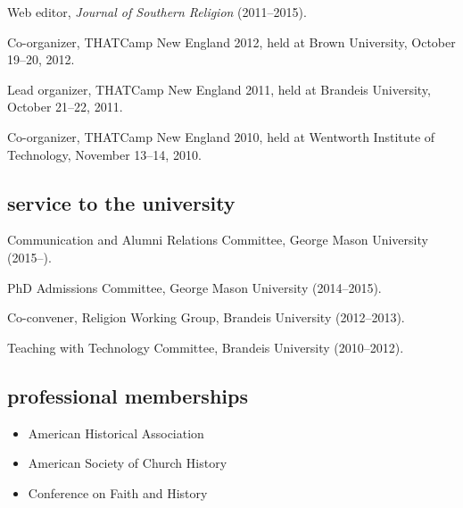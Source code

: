 \documentclass[11pt]{article}
\providecommand{\tightlist}{%
  \setlength{\itemsep}{0pt}\setlength{\parskip}{0pt}}
\begin{document}
Web editor, \emph{Journal of Southern Religion} (2011--2015).

Co-organizer, THATCamp New England 2012, held at Brown University,
October 19--20, 2012.

Lead organizer, THATCamp New England 2011, held at Brandeis University,
October 21--22, 2011.

Co-organizer, THATCamp New England 2010, held at Wentworth Institute of
Technology, November 13--14, 2010.


\subsection{service to the university}\label{service-university}

Communication and Alumni Relations Committee, George Mason University 
(2015--).

PhD Admissions Committee, George Mason University (2014--2015).

Co-convener, Religion Working Group, Brandeis University (2012--2013).

Teaching with Technology Committee, Brandeis University (2010--2012).





\subsection{professional memberships}\label{professional-memberships}

\begin{itemize}
    \tightlist
  \item
    American Historical Association
  \item
    American Society of Church History
  \item
    Conference on Faith and History
\end{itemize}
\end{document}
